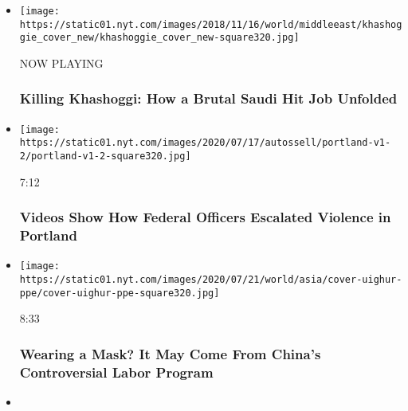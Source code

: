 \begin{itemize}
\item
  \texttt{[image: https://static01.nyt.com/images/2018/11/16/world/middleeast/khashoggie\_cover\_new/khashoggie\_cover\_new-square320.jpg]}

  NOW PLAYING

  \hypertarget{killing-khashoggi-how-a-brutal-saudi-hit-job-unfolded-2}{%
  \subsubsection{Killing Khashoggi: How a Brutal Saudi Hit Job
  Unfolded}\label{killing-khashoggi-how-a-brutal-saudi-hit-job-unfolded-2}}
\item
  \href{https://www.nytimes.com/video/us/100000007243995/portland-protests-federal-government.html?action=click\&module=video-series-bar\&region=header\&pgtype=Article\&playlistId=video/investigations}{}

  \texttt{[image: https://static01.nyt.com/images/2020/07/17/autossell/portland-v1-2/portland-v1-2-square320.jpg]}

  7:12

  \hypertarget{videos-show-how-federal-officers-escalated-violence-in-portland}{%
  \subsubsection{Videos Show How Federal Officers Escalated Violence in
  Portland}\label{videos-show-how-federal-officers-escalated-violence-in-portland}}
\item
  \href{https://www.nytimes.com/video/world/asia/100000007226041/china-coronavirus-masks-uighur-labor-ppe.html?action=click\&module=video-series-bar\&region=header\&pgtype=Article\&playlistId=video/investigations}{}

  \texttt{[image: https://static01.nyt.com/images/2020/07/21/world/asia/cover-uighur-ppe/cover-uighur-ppe-square320.jpg]}

  8:33

  \hypertarget{wearing-a-mask-it-may-come-from-chinas-controversial-labor-program}{%
  \subsubsection{Wearing a Mask? It May Come From China's Controversial
  Labor
  Program}\label{wearing-a-mask-it-may-come-from-chinas-controversial-labor-program}}
\item
  \href{https://www.nytimes.com/video/us/100000007122997/ice-deportations-coronavirus-video.html?action=click\&module=video-series-bar\&region=header\&pgtype=Article\&playlistId=video/investigations}{}


\end{itemize}
